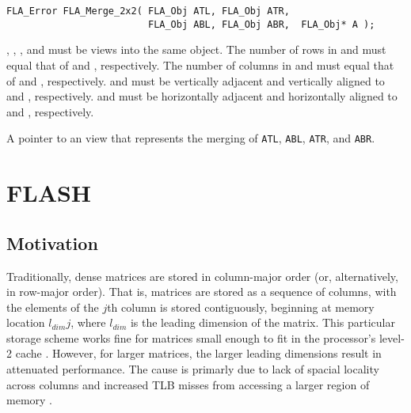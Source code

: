 
\begin{flaspec}
\begin{verbatim}
FLA_Error FLA_Merge_2x2( FLA_Obj ATL, FLA_Obj ATR,
                         FLA_Obj ABL, FLA_Obj ABR,  FLA_Obj* A );
\end{verbatim}
\begin{checks}
\checkitem
\ATLns, \ATRns, \ABLns, and \ABR must be views into the same object.
\itemvsp
\checkitem
The number of rows in \ATL and \ABL must equal that of \ATR and \ABRns, respectively.
\itemvsp
\checkitem
The number of columns in \ATL and \ATR must equal that of \ABL and \ABR, respectively.
\itemvsp
\checkitem
\ATL and \ATR must be vertically adjacent and vertically aligned to
\ABL and \ABRns, respectively.
\itemvsp
\checkitem
\ATL and \ABL must be horizontally adjacent and horizontally aligned to
\ATR and \ABRns, respectively.
\end{checks}
\rvalue{
\flasuccess
}
\begin{params}
                       {A pointer to an \flaobj view that represents the
                        merging of {\tt ATL}, {\tt ABL}, {\tt ATR}, and {\tt ABR}.}
\end{params}
\end{flaspec}













\section{FLASH}
\label{sec:flash}




\subsection{Motivation}


Traditionally, dense matrices are stored in column-major order (or,
alternatively, in row-major order).
That is, matrices are stored as a sequence of columns, with the elements of
the $ j $th column is stored contiguously, beginning at memory location $ l_{dim}j $,
where $ l_{dim} $ is the leading dimension of the matrix.
This particular storage scheme works fine for matrices small enough to fit in
the processor's level-2 cache \cite{Goto,Goto:2008:AHP}.
However, for larger matrices, the larger leading dimensions result in
attenuated performance.
The cause is primarly due to lack of spacial locality across columns and
increased TLB misses from accessing a larger region of memory \cite{Goto}.

